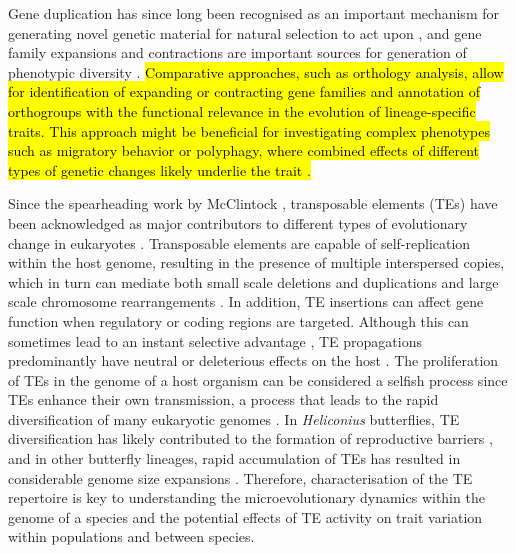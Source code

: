 \documentclass[twocolumn]{bmcart}%
\begin{document}
Gene duplication has since long been recognised as an important mechanism for generating novel genetic material for natural selection to act upon \citep{henikoffGeneFamiliesTaxonomy1997, ojeda-lopezEvolutionaryAnalysisMoringa2020, zhangDoesRecombinationShape2003}, and gene family expansions and contractions are important sources for generation of phenotypic diversity \citep{chenNewGenesDrivers2013a, kondrashovGeneDuplicationMechanism2012}. \hl{Comparative approaches, such as orthology analysis, allow for identification of expanding or contracting gene families and annotation of orthogroups with the functional relevance in the evolution of lineage-specific traits. This approach might be beneficial for investigating complex phenotypes such as migratory behavior or polyphagy, where combined effects of different types of genetic changes likely underlie the trait \citep{schwanderSupergenesComplexPhenotypes2014}.}

Since the spearheading work by McClintock \citep{mcclintockControllingElementsGene1956}, transposable elements (TEs) have been acknowledged as major contributors to different types of evolutionary change in eukaryotes \citep{kazazianMobileElementsDrivers2004, kidwellTransposableElementsSources1997}. Transposable elements are capable of self-replication within the host genome, resulting in the presence of multiple interspersed copies, which in turn can mediate both small scale deletions and duplications and large scale chromosome rearrangements \citep{kidwellTransposableElementsSources1997}. In addition, TE insertions can affect gene function when regulatory or coding regions are targeted. Although this can sometimes lead to an instant selective advantage \citep{vanthofIndustrialMelanismMutation2016}, TE propagations predominantly have neutral or deleterious effects on the host \citep{hedgesInvitingInstabilityTransposable2007}. The proliferation of TEs in the genome of a host organism can be considered a selfish process since TEs enhance their own transmission, a process that leads to the rapid diversification of many eukaryotic genomes \citep{wellsFieldGuideEukaryotic2020}. In \textit{Heliconius} butterflies, TE diversification has likely contributed to the formation of reproductive barriers \citep{raySimultaneousTEAnalysis2019}, and in other butterfly lineages, rapid accumulation of TEs has resulted in considerable genome size expansions \citep{podsiadlowskiGenomeAssemblyAnnotation2021, tallaRapidIncreaseGenome2017}. Therefore, characterisation of the TE repertoire is key to understanding the microevolutionary dynamics within the genome of a species and the potential effects of TE activity on trait variation within populations and between species.
\end{document}
